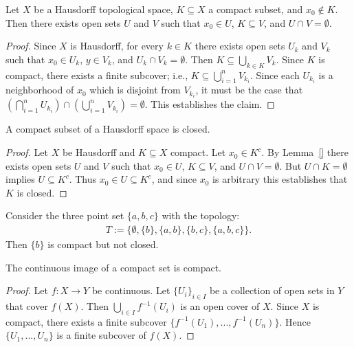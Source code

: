 \begin{lemma}
    Let $X$ be a Hausdorff topological space, $K \subseteq X$ a compact subset, and $x_0 \not\in K$. Then there exists open sets $U$ and $V$ such that $x_0 \in U$, $K \subseteq V$, and $U \cap V = \emptyset$.
\end{lemma}
    \begin{proof}
        Since $X$ is Hausdorff, for every $k \in K$ there exists open sets $U_k$ and $V_k$ such that $x_0 \in U_k$, $y \in V_k$, and $U_k \cap V_k = \emptyset$. Then $K \subseteq \bigcup_{k \in K}V_k$. Since $K$ is compact, there exists a finite subcover; i.e., $K \subseteq \bigcup_{i = 1}^n V_{k_i}$. Since each $U_{k_i}$ is a neighborhood of $x_0$ which is disjoint from $V_{k_i}$, it must be the case that $\left( \bigcap_{i = 1}^n U_{k_i} \right) \cap \left( \bigcup_{i = 1}^n V_{k_i} \right) = \emptyset$. This establishes the claim.
    \end{proof}

\begin{proposition}
    A compact subset of a Hausdorff space is closed.
\end{proposition}
    \begin{proof}
        Let $X$ be Hausdorff and $K \subseteq X$ compact. Let $x_0 \in K^c$. By Lemma~\ref{} there exists open sets $U$ and $V$ such that $x_0 \in U$, $K \subseteq V$, and $U \cap V = \emptyset$. But $U \cap K = \emptyset$ implies $U \subseteq K^c$. Thus $x_0 \in U \subseteq K^c$, and since $x_0$ is arbitrary this establishes that $K$ is closed.
    \end{proof}

\begin{example}
    Consider the three point set $\{a,b,c\}$ with the topology:
        \begin{equation*}
        \begin{split}
            T:=\{\emptyset,\{b\},\{a,b\},\{b,c\},\{a,b,c\}\}.
        \end{split}
        \end{equation*}
    Then $\{b\}$ is compact but not closed. 
\end{example}

\begin{proposition}
    The continuous image of a compact set is compact.
\end{proposition}
    \begin{proof}
        Let $f:X \rightarrow Y$ be continuous. Let $\{U_i\}_{i \in I}$ be a collection of open sets in $Y$ that cover $f(X)$. Then $\bigcup_{i \in I}f^{-1}(U_i)$ is an open cover of $X$. Since $X$ is compact, there exists a finite subcover $\{f^{-1}(U_1),...,f^{-1}(U_n)\}$. Hence $\{U_1,...,U_n\}$ is a finite subcover of $f(X)$.
    \end{proof}

